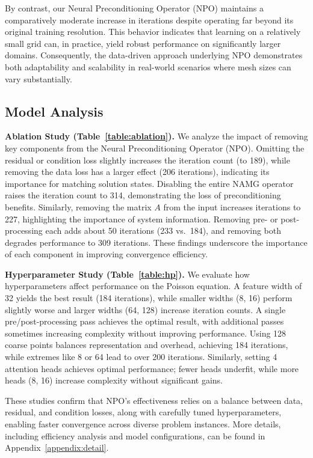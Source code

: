 By contrast, our Neural Preconditioning Operator (NPO) maintains a comparatively moderate increase in iterations despite operating far beyond its original training resolution. This behavior indicates that learning on a relatively small grid can, in practice, yield robust performance on significantly larger domains. Consequently, the data-driven approach underlying NPO demonstrates both adaptability and scalability in real-world scenarios where mesh sizes can vary substantially.



\subsection{Model Analysis}

\textbf{Ablation Study (Table~\ref{table:ablation}).}
We analyze the impact of removing key components from the Neural Preconditioning Operator (NPO). Omitting the residual or condition loss slightly increases the iteration count (to 189), while removing the data loss has a larger effect (206 iterations), indicating its importance for matching solution states. Disabling the entire NAMG operator raises the iteration count to 314, demonstrating the loss of preconditioning benefits. Similarly, removing the matrix \(A\) from the input increases iterations to 227, highlighting the importance of system information. Removing pre- or post-processing each adds about 50 iterations (233 vs.\ 184), and removing both degrades performance to 309 iterations. These findings underscore the importance of each component in improving convergence efficiency.

\textbf{Hyperparameter Study (Table~\ref{table:hp}).}
We evaluate how hyperparameters affect performance on the Poisson equation. A feature width of 32 yields the best result (184 iterations), while smaller widths (8, 16) perform slightly worse and larger widths (64, 128) increase iteration counts. A single pre/post-processing pass achieves the optimal result, with additional passes sometimes increasing complexity without improving performance. Using 128 coarse points balances representation and overhead, achieving 184 iterations, while extremes like 8 or 64 lead to over 200 iterations. Similarly, setting 4 attention heads achieves optimal performance; fewer heads underfit, while more heads (8, 16) increase complexity without significant gains.

These studies confirm that NPO’s effectiveness relies on a balance between data, residual, and condition losses, along with carefully tuned hyperparameters, enabling faster convergence across diverse problem instances. More details, including efficiency analysis and model configurations, can be found in Appendix~\ref{appendix:detail}.

